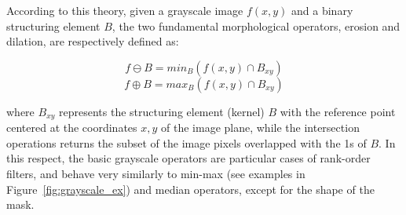 \documentclass{ieeeaccess}
\begin{document}
According to this theory, given a grayscale image $f(x,y)$ and a binary structuring element $B$, the two fundamental morphological operators, erosion and dilation, are respectively defined as:

\begin{equation} \label{eq:erode}
f \ominus B = min_B(f(x,y) \cap B_{xy})
\end{equation}
\vspace{-0.5cm}
\begin{equation} \label{eq:dilate}
f \oplus B = max_B(f(x,y) \cap B_{xy})
\end{equation}

where $B_{xy}$ represents the structuring element (kernel) $B$ with the reference point centered at the coordinates $x,y$ of the image plane, while the intersection operations returns the subset of the image pixels overlapped with the 1s of $B$. In this respect, the basic grayscale operators are particular cases of rank-order filters, and behave very similarly to min-max (see examples in Figure~\ref{fig:grayscale_ex}) and median operators, except for the shape of the mask. 
\end{document}
